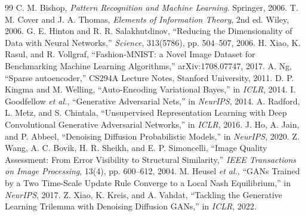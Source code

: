\documentclass{article}
\begin{document}
\renewcommand{\refname}{Daftar Pustaka}
\begin{thebibliography}{99}
     C. M. Bishop, \emph{Pattern Recognition and Machine Learning}. Springer, 2006.
     T. M. Cover and J. A. Thomas, \emph{Elements of Information Theory}, 2nd ed. Wiley, 2006.
     G. E. Hinton and R. R. Salakhutdinov, ``Reducing the Dimensionality of Data with Neural Networks,'' \emph{Science}, 313(5786), pp. 504--507, 2006.
     H. Xiao, K. Rasul, and R. Vollgraf, ``Fashion-MNIST: a Novel Image Dataset for Benchmarking Machine Learning Algorithms,'' arXiv:1708.07747, 2017.
     A. Ng, ``Sparse autoencoder,'' CS294A Lecture Notes, Stanford University, 2011.
     D. P. Kingma and M. Welling, ``Auto-Encoding Variational Bayes,'' in \emph{ICLR}, 2014.
     I. Goodfellow \emph{et al.}, ``Generative Adversarial Nets,'' in \emph{NeurIPS}, 2014.
     A. Radford, L. Metz, and S. Chintala, ``Unsupervised Representation Learning with Deep Convolutional Generative Adversarial Networks,'' in \emph{ICLR}, 2016.
     J. Ho, A. Jain, and P. Abbeel, ``Denoising Diffusion Probabilistic Models,'' in \emph{NeurIPS}, 2020.
     Z. Wang, A. C. Bovik, H. R. Sheikh, and E. P. Simoncelli, ``Image Quality Assessment: From Error Visibility to Structural Similarity,'' \emph{IEEE Transactions on Image Processing}, 13(4), pp. 600--612, 2004.
     M. Heusel \emph{et al.}, ``GANs Trained by a Two Time-Scale Update Rule Converge to a Local Nash Equilibrium,'' in \emph{NeurIPS}, 2017.
     Z. Xiao, K. Kreis, and A. Vahdat, ``Tackling the Generative Learning Trilemma with Denoising Diffusion GANs,'' in \emph{ICLR}, 2022.
\end{thebibliography}
\end{document}
